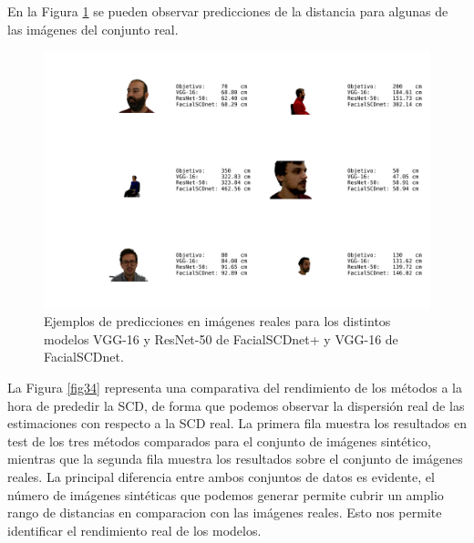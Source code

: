 En la Figura \ref{fig37} se pueden observar predicciones de la distancia para algunas de las imágenes del conjunto real.

\begin{figure}[h]
	\centering
	\includegraphics[width=\textwidth]{imagenes/cap5/predicts_real.png}
	\caption[Ejemplos de predicciones en imágenes reales.]{Ejemplos de predicciones en imágenes reales para los distintos modelos VGG-16 y ResNet-50 de FacialSCDnet+ y VGG-16 de FacialSCDnet.}
	\label{fig37}
\end{figure}

La Figura \ref{fig34} representa una comparativa del rendimiento de los métodos a la hora de prededir la SCD, de forma que podemos observar la dispersión real de las estimaciones con respecto a la SCD real. La primera fila muestra los resultados en test de los tres métodos comparados para el conjunto de imágenes sintético, mientras que la segunda fila muestra los resultados sobre el conjunto de imágenes reales. La principal diferencia entre ambos conjuntos de datos es evidente, el número de imágenes sintéticas que podemos generar permite cubrir un amplio rango de distancias en comparacion con las imágenes reales. Esto nos permite identificar el rendimiento real de los modelos. 

